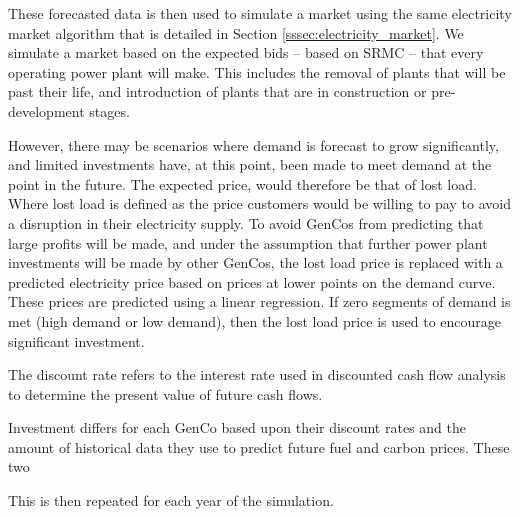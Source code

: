 These forecasted data is then used to simulate a market using the same electricity market algorithm that is detailed in Section \ref{sssec:electricity_market}. We simulate a market based on the expected bids -- based on SRMC -- that every operating power plant will make. This includes the removal of plants that will be past their life, and introduction of plants that are in construction or pre-development stages. 

However, there may be scenarios where demand is forecast to grow significantly, and limited investments have, at this point, been made to meet demand at the point in the future. The expected price, would therefore be that of lost load. Where lost load is defined as the price customers would be willing to pay to avoid a disruption in their electricity supply. To avoid GenCos from predicting that large profits will be made, and under the assumption that further power plant investments will be made by other GenCos, the lost load price is replaced with a predicted electricity price based on prices at lower points on the demand curve. These prices are predicted using a linear regression. If zero segments of demand is met (high demand or low demand), then the lost load price is used to encourage significant investment.




The discount rate refers to the interest rate used in discounted cash flow analysis to determine the present value of future cash flows.


Investment differs for each GenCo based upon their discount rates and the amount of historical data they use to predict future fuel and carbon prices. These two 




This is then repeated for each year of the simulation.



